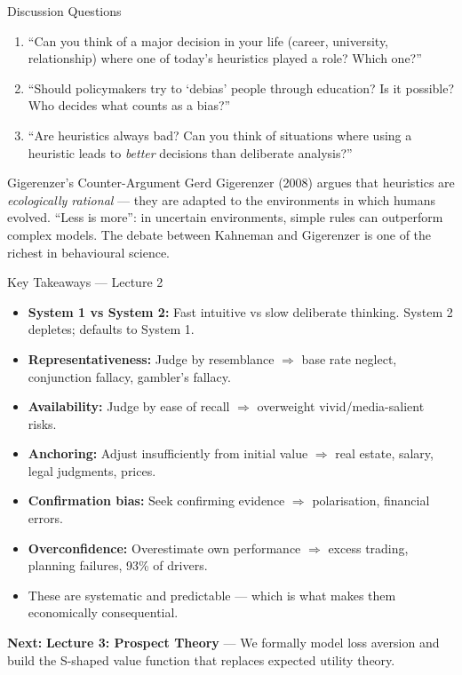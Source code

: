 \documentclass[aspectratio=169]{beamer}
\begin{document}
\begin{frame}{Discussion Questions}
\begin{enumerate}
  \item[\textcolor{bepurple}{Q1.}] ``Can you think of a major decision in your life (career, university, relationship) where one of today's heuristics played a role? Which one?''
  \medskip
  \item[\textcolor{beteal}{Q2.}] ``Should policymakers try to `debias' people through education? Is it possible? Who decides what counts as a bias?''
  \medskip
  \item[\textcolor{berust}{Q3.}] ``Are heuristics always bad? Can you think of situations where using a heuristic leads to \textit{better} decisions than deliberate analysis?''
\end{enumerate}
\medskip
\begin{exampleblock}{Gigerenzer's Counter-Argument}
Gerd Gigerenzer (2008) argues that heuristics are \textit{ecologically rational} --- they are adapted to the environments in which humans evolved. ``Less is more'': in uncertain environments, simple rules can outperform complex models. The debate between Kahneman and Gigerenzer is one of the richest in behavioural science.
\end{exampleblock}
\end{frame}

\begin{frame}{Key Takeaways --- Lecture 2}
\begin{itemize}
  \item[\textcolor{beteal}{\checkmark}] \textbf{System 1 vs System 2:} Fast intuitive vs slow deliberate thinking. System 2 depletes; defaults to System 1.
  \item[\textcolor{beteal}{\checkmark}] \textbf{Representativeness:} Judge by resemblance $\Rightarrow$ base rate neglect, conjunction fallacy, gambler's fallacy.
  \item[\textcolor{beteal}{\checkmark}] \textbf{Availability:} Judge by ease of recall $\Rightarrow$ overweight vivid/media-salient risks.
  \item[\textcolor{beteal}{\checkmark}] \textbf{Anchoring:} Adjust insufficiently from initial value $\Rightarrow$ real estate, salary, legal judgments, prices.
  \item[\textcolor{beteal}{\checkmark}] \textbf{Confirmation bias:} Seek confirming evidence $\Rightarrow$ polarisation, financial errors.
  \item[\textcolor{beteal}{\checkmark}] \textbf{Overconfidence:} Overestimate own performance $\Rightarrow$ excess trading, planning failures, 93\% of drivers.
  \item[\textcolor{beteal}{\checkmark}] These are \alert{systematic and predictable} --- which is what makes them economically consequential.
\end{itemize}
\medskip\textcolor{beblue}{\textbf{Next:}} \textbf{Lecture 3: Prospect Theory} --- We formally model loss aversion and build the S-shaped value function that replaces expected utility theory.
\end{frame}
\end{document}
